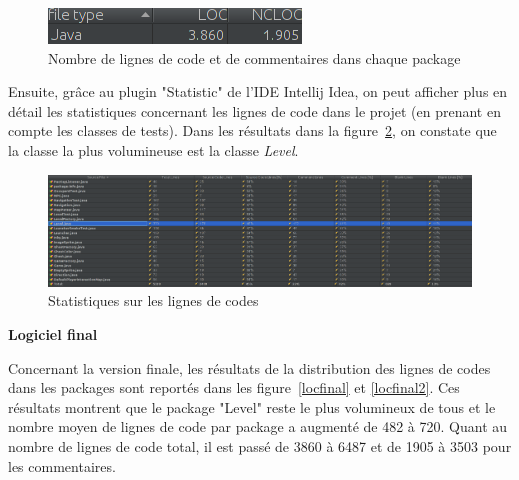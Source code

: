\documentclass[12pt, openany]{report}
\begin{document}
\begin{figure}[!h]
	\centering
	\includegraphics[scale=0.6]{Images/SizeMetricsLOC2.png} 
	\caption{Nombre de lignes de code et de commentaires dans chaque package}
	\label{locinit2}
\end{figure}

\newpage
Ensuite, grâce au plugin "Statistic" de l'IDE Intellij Idea, on peut afficher plus en détail les statistiques concernant les lignes de code dans le projet (en prenant en compte les classes de tests). Dans les résultats dans la figure~\ref{locinit3}, on constate que la classe la plus volumineuse est la classe \mbox{\textit{Level}}.

\begin{figure}[!h]
	\centering
	\includegraphics[scale=0.29]{Images/SizeMetricsLOC3.png} 
	\caption{Statistiques sur les lignes de codes}
	\label{locinit3}
\end{figure}



\textbf{Logiciel final}

Concernant la version finale, les résultats de la distribution des lignes de codes dans les packages sont reportés dans les figure~\ref{locfinal} et \ref{locfinal2}. Ces résultats montrent que le package "Level" reste le plus volumineux de tous et le nombre moyen de lignes de code par package a augmenté de 482 à 720. Quant au nombre de lignes de code total, il est passé de 3860 à 6487 et de 1905 à 3503 pour les commentaires.
\end{document}
